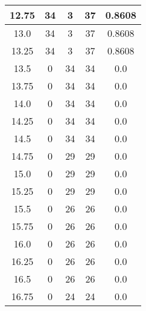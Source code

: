 \documentclass[letterpaper, 12pt]{article}
\begin{document}
\begin{longtable}{|c|c|c|c|c|}
\hline
12.75 & 34 & 3 & 37 & 0.8608 \\
\hline
13.0 & 34 & 3 & 37 & 0.8608 \\
\hline
13.25 & 34 & 3 & 37 & 0.8608 \\
\hline
13.5 & 0 & 34 & 34 & 0.0 \\
\hline
13.75 & 0 & 34 & 34 & 0.0 \\
\hline
14.0 & 0 & 34 & 34 & 0.0 \\
\hline
14.25 & 0 & 34 & 34 & 0.0 \\
\hline
14.5 & 0 & 34 & 34 & 0.0 \\
\hline
14.75 & 0 & 29 & 29 & 0.0 \\
\hline
15.0 & 0 & 29 & 29 & 0.0 \\
\hline
15.25 & 0 & 29 & 29 & 0.0 \\
\hline
15.5 & 0 & 26 & 26 & 0.0 \\
\hline
15.75 & 0 & 26 & 26 & 0.0 \\
\hline
16.0 & 0 & 26 & 26 & 0.0 \\
\hline
16.25 & 0 & 26 & 26 & 0.0 \\
\hline
16.5 & 0 & 26 & 26 & 0.0 \\
\hline
16.75 & 0 & 24 & 24 & 0.0 \\
\hline
\end{longtable}
\end{document}
